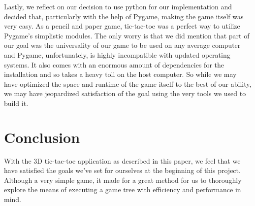 \documentclass[preprint,12pt]{elsarticle}
\begin{document}
	Lastly, we reflect on our decision to use python for our implementation and decided that, particularly with the help of Pygame, making the game itself was very easy. As a pencil and paper game, tic-tac-toe was a perfect way to utilize Pygame's simplistic modules. The only worry is that we did mention that part of our goal was the universality of our game to be used on any average computer and Pygame, unfortunately, is highly incompatible with updated operating systems. It also comes with an enormous amount of dependencies for the installation and so takes a heavy toll on the host computer. So while we may have optimized the space and runtime of the game itself to the best of our ability, we may have jeopardized satisfaction of the goal using the very tools we used to build it.

\section{Conclusion}
	With the 3D tic-tac-toe application as described in this paper, we feel that we have satisfied the goals we've set for ourselves at the beginning of this project. Although a very simple game, it made for a great method for us to thoroughly explore the means of executing a game tree with efficiency and performance in mind.
\end{document}
